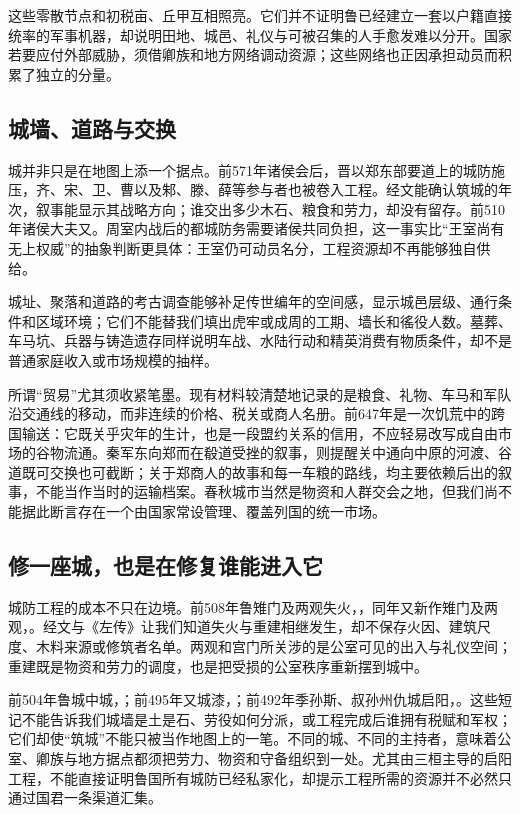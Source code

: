 这些零散节点和初税亩、丘甲互相照亮。它们并不证明鲁已经建立一套以户籍直接统率的军事机器，却说明田地、城邑、礼仪与可被召集的人手愈发难以分开。国家若要应付外部威胁，须借卿族和地方网络调动资源；这些网络也正因承担动员而积累了独立的分量。

\subsection{城墙、道路与交换}

城并非只是在地图上添一个据点。前571年诸侯会后，晋以郑东部要道上的城防施压，齐、宋、卫、曹以及邾、滕、薛等参与者也被卷入工程。经文能确认筑城的年次，叙事能显示其战略方向；谁交出多少木石、粮食和劳力，却没有留存。前510年诸侯大夫又。周室内战后的都城防务需要诸侯共同负担，这一事实比“王室尚有无上权威”的抽象判断更具体：王室仍可动员名分，工程资源却不再能够独自供给。

城址、聚落和道路的考古调查能够补足传世编年的空间感，显示城邑层级、通行条件和区域环境；它们不能替我们填出虎牢或成周的工期、墙长和徭役人数。墓葬、车马坑、兵器与铸造遗存同样说明车战、水陆行动和精英消费有物质条件，却不是普通家庭收入或市场规模的抽样。

所谓“贸易”尤其须收紧笔墨。现有材料较清楚地记录的是粮食、礼物、车马和军队沿交通线的移动，而非连续的价格、税关或商人名册。前647年是一次饥荒中的跨国输送：它既关乎灾年的生计，也是一段盟约关系的信用，不应轻易改写成自由市场的谷物流通。秦军东向郑而在殽道受挫的叙事，则提醒关中通向中原的河渡、谷道既可交换也可截断；关于郑商人的故事和每一车粮的路线，均主要依赖后出的叙事，不能当作当时的运输档案。春秋城市当然是物资和人群交会之地，但我们尚不能据此断言存在一个由国家常设管理、覆盖列国的统一市场。

\subsection{修一座城，也是在修复谁能进入它}

城防工程的成本不只在边境。前508年鲁雉门及两观失火，，同年又新作雉门及两观，。经文与《左传》让我们知道失火与重建相继发生，却不保存火因、建筑尺度、木料来源或修筑者名单。两观和宫门所关涉的是公室可见的出入与礼仪空间；重建既是物资和劳力的调度，也是把受损的公室秩序重新摆到城中。

前504年鲁城中城，；前495年又城漆，；前492年季孙斯、叔孙州仇城启阳，。这些短记不能告诉我们城墙是土是石、劳役如何分派，或工程完成后谁拥有税赋和军权；它们却使“筑城”不能只被当作地图上的一笔。不同的城、不同的主持者，意味着公室、卿族与地方据点都须把劳力、物资和守备组织到一处。尤其由三桓主导的启阳工程，不能直接证明鲁国所有城防已经私家化，却提示工程所需的资源并不必然只通过国君一条渠道汇集。

